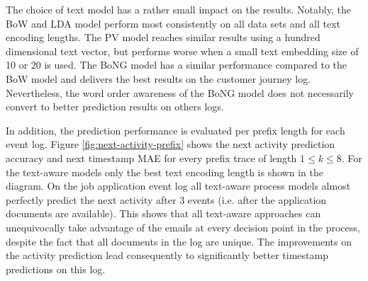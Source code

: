 The choice of text model has a rather small impact on the results.
Notably, the BoW and LDA model perform most consistently on all data sets and all text encoding lengths.
The PV model reaches similar results using a hundred dimensional text vector, but performs worse when a small text embedding size of 10 or 20 is used.
The BoNG model has a similar performance compared to the BoW model and delivers the best results on the customer journey log.
Nevertheless, the word order awareness of the BoNG model does not necessarily convert to better prediction results on others logs.

In addition, the prediction performance is evaluated per prefix length for each event log.
Figure \ref{fig:next-activity-prefix} shows the next activity prediction accuracy and next timestamp MAE for every prefix trace of length $1 \leq k \leq 8$.
For the text-aware models only the best text encoding length is shown in the diagram.
On the job application event log all text-aware process models almost perfectly predict the next activity after 3 events (i.e. after the application documents are available).
This shows that all text-aware approaches can unequivocally take advantage of the emails at every decision point in the process, despite the fact that all documents in the log are unique.
The improvements on the activity prediction lead consequently to significantly better timestamp predictions on this log.








